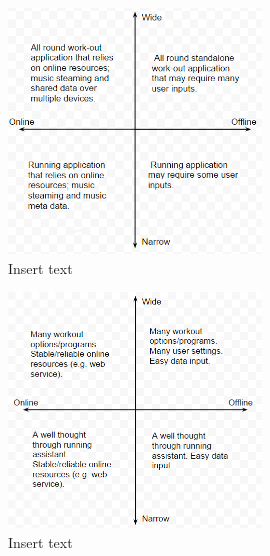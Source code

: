 \begin{figure}[h!]
  \centering
    \includegraphics[width=0.6\textwidth]{Images/axis1.PNG}
    \caption{Insert text}
    \label{fig:axis1}
\end{figure}

\begin{figure}[h!]
  \centering
    \includegraphics[width=0.6\textwidth]{Images/axis2.PNG}
    \caption{Insert text}
    \label{fig:axis2}
\end{figure}
